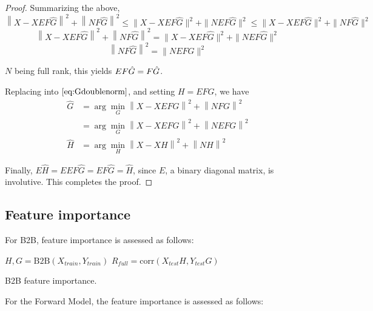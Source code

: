 \begin{proof}
Summarizing the above,
$$\left \| X - XEF\hat G\right\| ^2  + \left \| NF\hat G\right \| ^2 \leq \| X - XEF\hat G \| ^2  + \| NEF\hat G \| ^2 \leq \| X - XEF\hat G \| ^2  + \| NF\hat G \| ^2$$
$$\left \| X - XEF\hat G\right\| ^2  + \left \| NF\hat G\right \| ^2 = \| X - XEF\hat G \| ^2  + \| NEF\hat G \| ^2$$
$$\left \| NF\hat G\right \| ^2 =  \| NEF\hat G \| ^2$$

$N$ being full rank, this yields $EF\hat G = F\Hat G$.

Replacing into $\eqref{eq:Gdoublenorm}$, and setting $H = EFG$, we have
\begin{align*}
	\hat G &=  \arg \min_G  \left \| X - XEFG\right \| ^2  + \left \| NFG\right \| ^2 \\
	&=   \arg \min_G \left \| X - XEFG\right \| ^2  + \left \| NEFG\right \| ^2 \\
	\hat H &=  \arg \min_H \left \| X - XH\right \| ^2  + \left \| NH\right \| ^2
	\label{eq:4}
\end{align*}

Finally, $E\hat H = E EF\hat G = EF\hat G = \hat H$, since $E$, a binary diagonal matrix, is involutive. This completes the proof.
\end{proof}



\newpage
\subsection{Feature importance}
\label{appendix:feature_importance}

For B2B, feature importance is assessed as follows:

\begin{algorithm}[H]
      $H, G = \text{B2B}(X_{train}, Y_{train})$\;
$R_{full} = \text{corr}(X_{test} H, Y_{test} G)$\;

 \caption{B2B feature importance.} \label{algorithm:b2b_fi}
\end{algorithm}

For the Forward Model, the feature importance is assessed as follows:

